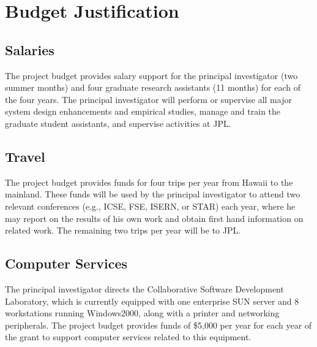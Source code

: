 

\section*{Budget Justification}

\renewcommand{\thepage} {F--\arabic{page}}

\subsection*{Salaries}

The project budget provides salary support for the principal investigator
(two summer months) and four graduate research
assistants (11 months) for each of the four years.  The principal
investigator will perform or supervise all major system design enhancements
and empirical studies, manage and train the graduate student
assistants, and supervise activities at JPL.

\subsection*{Travel}

The project budget provides funds for four trips per year from Hawaii to the
mainland.  These funds will be used by the principal investigator to attend
two relevant conferences (e.g., ICSE, FSE, ISERN, or STAR) each year, where
he may report on the results of his own work and obtain first hand
information on related work. The remaining two trips per year will be to JPL. 

\subsection*{Computer Services}

The principal investigator directs the Collaborative Software Development
Laboratory, which is currently equipped with one enterprise SUN server and 8
workstations running Windows2000, along with a printer and 
networking peripherals.  The project budget provides funds of \$5,000
per year for each year of the grant to support computer services related
to this equipment.

